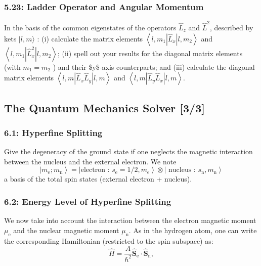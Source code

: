 \documentclass[11pt]{article}
\begin{document}
\subsubsection{5.23: Ladder Operator and Angular Momentum}
\label{sec:org6a48e2d}
In the basis of the common eigenstates of the operators \(\hat{L}_z\) and
\(\hat{L}^2\), described by kets \(|l, m\rangle\) : (i) calculate the matrix
elements \(\left\langle l, m_1\left|\hat{L}_x\right| l, m_2\right\rangle\) and
\(\left\langle l, m_1\left|\hat{L}_x^2\right| l, m_2\right\rangle\); (ii) spell
out your results for the diagonal matrix elements (with \(m_1=m_2\) ) and their
\$y\$-axis counterparts; and (iii) calculate the diagonal matrix elements
\(\left\langle l, m\left|\hat{L}_x \hat{L}_y\right| l, m\right\rangle\) and
\(\left\langle l, m\left|\hat{L}_y \hat{L}_x\right| l, m\right\rangle\).
\subsection{The Quantum Mechanics Solver [3/3]}
\label{sec:orgd9608be}
\subsubsection{6.1: Hyperfine Splitting}
\label{sec:org1b1987a}
Give the degeneracy of the ground state if one neglects the magnetic interaction
between the nucleus and the external electron. We note $$
\left.\left.\left|m_{\mathrm{e}} ; m_{\mathrm{n}}\right\rangle=\mid \text {
electron : } s_{\mathrm{e}}=1 / 2, m_{\mathrm{e}}\right\rangle \otimes \mid
\text { nucleus : } s_{\mathrm{n}}, m_{\mathrm{n}}\right\rangle $$ a basis of
the total spin states (external electron + nucleus).
\subsubsection{6.2: Energy Level of Hyperfine Splitting}
\label{sec:orgb82d2d9}
We now take into account the interaction between the electron magnetic moment
\(\mu_{\mathrm{e}}\) and the nuclear magnetic moment \(\mu_{\mathrm{n}}\). As in the
hydrogen atom, one can write the corresponding Hamiltonian (restricted to the
spin subspace) as: $$ \hat{H}=\frac{A}{\hbar^2}
\hat{\boldsymbol{S}}_{\mathrm{e}} \cdot \hat{\boldsymbol{S}}_{\mathrm{n}}, $$
\end{document}
